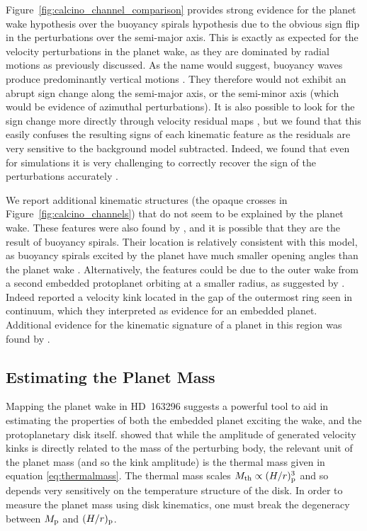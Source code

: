 Figure~\ref{fig:calcino_channel_comparison} provides strong evidence for the planet wake hypothesis over the buoyancy spirals hypothesis due to the obvious sign flip in the perturbations over the semi-major axis.
This is exactly as expected for the velocity perturbations in the planet wake, as they are dominated by radial motions as previously discussed.
As the name would suggest, buoyancy waves produce predominantly vertical motions \citep{bae2021}.
They therefore would not exhibit an abrupt sign change along the semi-major axis, or the semi-minor axis (which would be evidence of azimuthal perturbations).
It is also possible to look for the sign change more directly through velocity residual maps \citep{teague2021,izquierdo2021}, but we found that this easily confuses the resulting signs of each kinematic feature as the residuals are very sensitive to the background model subtracted.
Indeed, we found that even for simulations it is very challenging to correctly recover the sign of the perturbations accurately \citep[see Appendix~A of][for further detail]{calcino2022}.

We report additional kinematic structures (the opaque crosses in Figure~\ref{fig:calcino_channels}) that do not seem to be explained by the planet wake.
These features were also found by \citet{teague2021}, and it is possible that they are the result of buoyancy spirals.
Their location is relatively consistent with this model, as buoyancy spirals excited by the planet have much smaller opening angles than the planet wake \citep{bae2021}.
Alternatively, the features could be due to the outer wake from a second embedded protoplanet orbiting at a smaller radius, as suggested by \citet{teague2018}.
Indeed \citep{pinte2020} reported a velocity kink located in the gap of the outermost ring seen in continuum, which they interpreted as evidence for an embedded planet.
Additional evidence for the kinematic signature of a planet in this region was found by \citet{teague2021}. 

\subsection{Estimating the Planet Mass}

Mapping the planet wake in HD~163296 suggests a powerful tool to aid in estimating the properties of both the embedded planet exciting the wake, and the protoplanetary disk itself.
 showed that while the amplitude of generated velocity kinks is directly related to the mass of the perturbing body, the relevant unit of the planet mass (and so the kink amplitude) is the thermal mass \citep{goodman2001} given in equation \ref{eq:thermalmass}.
The thermal mass scales $M_{\rm th} \propto (H/r)_{\rm p}^3$ and so depends very sensitively on the temperature structure of the disk.
In order to measure the planet mass using disk kinematics, one must break the degeneracy between $M_{\rm p}$ and $(H/r)_{\rm p}$.

